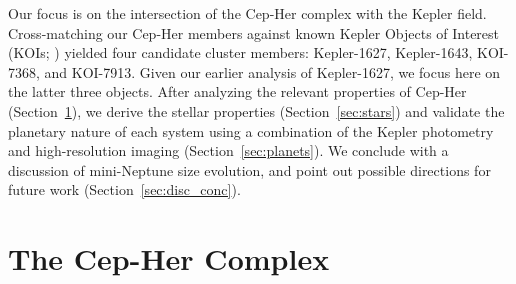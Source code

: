 \documentclass[12pt,twocolumn]{aastex63}
\begin{document}
Our focus is on the intersection of the Cep-Her complex with the
Kepler field.  Cross-matching our Cep-Her members against known Kepler
Objects of Interest (KOIs; \citealt{thompson_planetary_2018}) yielded
four candidate cluster members: Kepler-1627, Kepler-1643, KOI-7368,
and KOI-7913.  Given our earlier analysis of Kepler-1627, we focus
here on the latter three objects.  After analyzing the relevant
properties of Cep-Her (Section~\ref{sec:cluster}), we derive the
stellar properties (Section~\ref{sec:stars}) and validate the
planetary nature of each system using a combination of the Kepler
photometry and high-resolution imaging (Section~\ref{sec:planets}).
We conclude with a discussion of mini-Neptune size evolution, and
point out possible directions for future work
(Section~\ref{sec:disc_conc}).

\section{The Cep-Her Complex}
\label{sec:cluster}
\end{document}
